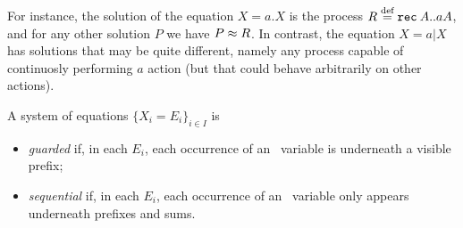

For instance, the solution of the equation 
$ X = a. X$ 
is  the process
$R \stackrel{\mbox{\scriptsize def}}{=} {\tt rec}\: A . . a A$, and   for any other solution $P$ we have $P \approx R$.
In contrast, the equation 
 $X = a|  X$ has solutions that may be quite different, namely any process capable of
continuosly  performing $a$ action (but that could behave arbitrarily  on other actions). 

 



\begin{definition}
A system of equations 
$\{  X_i = E_i\}_{i\in I}$
 is 
\begin{itemize}
\item
\emph{guarded} if,  in each    $E_i$, each occurrence of
an \behav\  variable is underneath a visible prefix;



\item 
 \emph{sequential} if,  in each    $E_i$, each occurrence of
an \behav\  variable only appears  underneath prefixes and sums.
\end{itemize}
 \end{definition}


